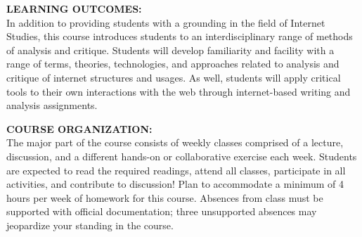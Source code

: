 \documentclass[10pt]{article}
\begin{document}
\textbf{LEARNING OUTCOMES:}\\
In addition to providing students with a grounding in the field of Internet Studies, this course introduces students to an interdisciplinary range of methods of analysis and critique. Students will develop familiarity and facility with a range of terms, theories, technologies, and approaches related to analysis and critique of internet structures and usages. As well, students will apply critical tools to their own interactions with the web through internet-based writing and analysis assignments.

\textbf{COURSE ORGANIZATION:}\\
The major part of the course consists of weekly classes comprised of a lecture, discussion, and a different hands-on or collaborative exercise each week. Students are expected to read the required readings, attend all classes, participate in all activities, and contribute to discussion! Plan to accommodate a minimum of 4 hours per week of homework for this course. Absences from class must be supported with official documentation; three unsupported absences may jeopardize your standing in the course.


\end{document}
